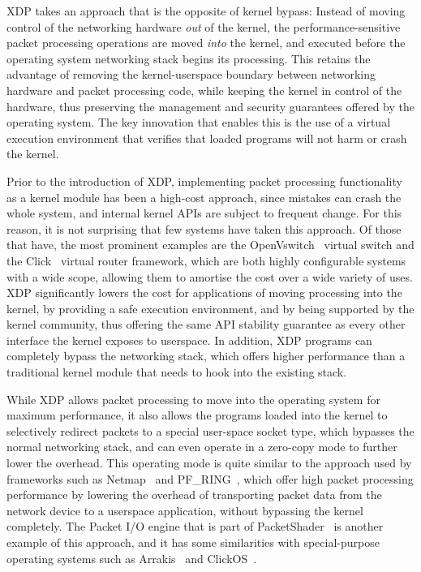 \documentclass[sigconf]{acmart}
\begin{document}
XDP takes an approach that is the opposite of kernel bypass: Instead of moving
control of the networking hardware \emph{out} of the kernel, the
performance-sensitive packet processing operations are moved \emph{into} the
kernel, and executed before the operating system networking stack begins its
processing. This retains the advantage of removing the kernel-userspace boundary
between networking hardware and packet processing code, while keeping the kernel
in control of the hardware, thus preserving the management and security
guarantees offered by the operating system. The key innovation that enables this
is the use of a virtual execution environment that verifies that loaded programs
will not harm or crash the kernel.

%
Prior to the introduction of XDP, implementing packet processing functionality
as a kernel module has been a high-cost approach, since mistakes can crash the
whole system, and internal kernel APIs are subject to frequent change. For this
reason, it is not surprising that few systems have taken this approach. Of those
that have, the most prominent examples are the OpenVswitch~\cite{openvswitch}
virtual switch and the Click~\cite{morris1999click} virtual router framework,
which are both highly configurable systems with a wide scope, allowing them to
amortise the cost over a wide variety of uses. XDP significantly lowers the cost
for applications of moving processing into the kernel, by providing a safe
execution environment, and by being supported by the kernel community, thus
offering the same API stability guarantee as every other interface the kernel
exposes to userspace. In addition, XDP programs can completely bypass the
networking stack, which offers higher performance than a traditional kernel
module that needs to hook into the existing stack.

While XDP allows packet processing to move into the operating system for maximum
performance, it also allows the programs loaded into the kernel to selectively
redirect packets to a special user-space socket type, which bypasses the normal
networking stack, and can even operate in a zero-copy mode to further lower the
overhead. This operating mode is quite similar to the approach used by
frameworks such as Netmap~\cite{rizzo2012netmap} and
PF\_RING~\cite{deri2009modern}, which offer high packet processing performance
by lowering the overhead of transporting packet data from the network device to
a userspace application, without bypassing the kernel completely. The Packet I/O
engine that is part of PacketShader~\cite{han2010packetshader} is another
example of this approach, and it has some similarities with special-purpose
operating systems such as Arrakis~\cite{peter2016arrakis} and
ClickOS~\cite{martins2014clickos}.
\end{document}
